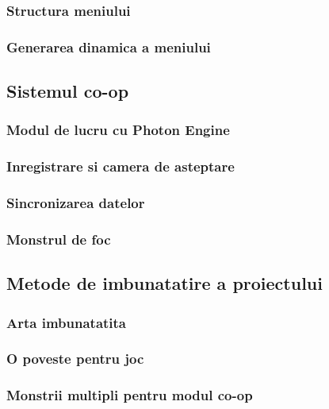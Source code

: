 \documentclass[12pt, a4paper]{article}
\begin{document}
	\subsubsection{Structura meniului}
	
	\subsubsection{Generarea dinamica a meniului}
	
	
	\subsection{Sistemul co-op}
	
	\subsubsection{Modul de lucru cu Photon Engine}
	
	\subsubsection{Inregistrare si camera de asteptare}
	
	\subsubsection{Sincronizarea datelor}
	
	\subsubsection{Monstrul de foc}
	
	\subsection{Metode de imbunatatire a proiectului}
	
	\subsubsection{Arta imbunatatita}
	
	\subsubsection{O poveste pentru joc}
	
	\subsubsection{Monstrii multipli pentru modul co-op}
	
\end{document}
